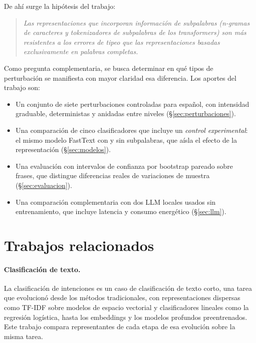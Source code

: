 \documentclass[11pt,a4paper]{article}
\begin{document}
De ahí surge la hipótesis del trabajo:

\begin{quote}
\emph{Las representaciones que incorporan información de subpalabras (n-gramas de caracteres y
tokenizadores de subpalabras de los transformers) son más resistentes a los errores de tipeo
que las representaciones basadas exclusivamente en palabras completas.}
\end{quote}

Como pregunta complementaria, se busca determinar en qué tipos de perturbación se manifiesta
con mayor claridad esa diferencia. Los aportes del trabajo son:
\begin{itemize}
  \item Un conjunto de siete perturbaciones controladas para español, con intensidad graduable,
        deterministas y anidadas entre niveles (\S\ref{sec:perturbaciones}).
  \item Una comparación de cinco clasificadores que incluye un \emph{control experimental}:
        el mismo modelo FastText con y sin subpalabras, que aísla el efecto de la
        representación (\S\ref{sec:modelos}).
  \item Una evaluación con intervalos de confianza por bootstrap pareado sobre frases, que
        distingue diferencias reales de variaciones de muestra (\S\ref{sec:evaluacion}).
  \item Una comparación complementaria con dos LLM locales usados sin entrenamiento, que
        incluye latencia y consumo energético (\S\ref{sec:llm}).
\end{itemize}

\section{Trabajos relacionados}

\paragraph{Clasificación de texto.} La clasificación de intenciones es un caso de
clasificación de texto corto, una tarea que evolucionó desde los métodos tradicionales, con
representaciones dispersas como TF-IDF sobre modelos de espacio vectorial y clasificadores
lineales como la regresión logística, hasta los embeddings y los modelos profundos
preentrenados. Este trabajo compara representantes de cada etapa de esa evolución sobre la
misma tarea.
\end{document}

